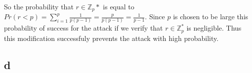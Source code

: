 \documentclass[letterpaper,12pt,oneside,onecolumn]{report}
\begin{document}
\paragraph{}
So the probability that $r \in \mathbb{Z}_p*$ is equal to $Pr(r < p) = \sum_{i=1}^p \frac{1}{p(p-1)} = \frac{p}{p(p-1)} = \frac{1}{p-1}$. Since $p$ is chosen to be large this probability of success for the attack if we verify that $r \in \mathbb{Z}_p^*$ is negligible. Thus this modification successfuly prevents the attack with high probability.
\subsection*{d}
\paragraph{}
\end{document}
